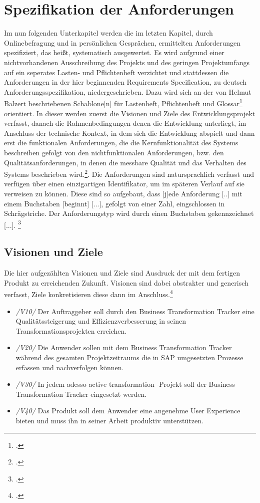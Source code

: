 \section{Spezifikation der Anforderungen}
Im nun folgenden Unterkapitel werden die im letzten Kapitel, durch Onlinebefragung und in persönlichen Gesprächen, ermittelten Anforderungen spezifiziert, das heißt, systematisch ausgewertet. Es wird aufgrund einer nichtvorhandenen Ausschreibung des Projekts und des geringen Projektumfangs auf ein seperates Lasten- und Pflichtenheft verzichtet und stattdessen die Anforderungen in der hier beginnenden \glqq{}Requirements Specification\grqq{}, zu deutsch \glqq{}Anforderungsspezifikation\grqq{}, niedergeschrieben. Dazu wird sich an der von Helmut Balzert beschriebenen \glqq{}Schablone[n] für Lastenheft, Pflichtenheft und Glossar\grqq{}\footcite[S. 492]{balzert} orientiert. In dieser werden zuerst die Visionen und Ziele des Entwicklungsprojekt verfasst, danach die Rahmenbedingungen denen die Entwicklung unterliegt, im Anschluss der technische Kontext, in dem sich die Entwicklung abspielt und dann erst die funktionalen Anforderungen, die die Kernfunktionalität des Systems beschreiben gefolgt von den nichtfunktionalen Anforderungen, bzw. den Qualitätsanforderungen, in denen die messbare Qualität und das Verhalten des Systems beschrieben wird.\footcite[Vgl.][S. 492 ff.]{balzert}. Die Anforderungen sind natursprachlich verfasst und verfügen über einen einzigartigen Identifikator, um im späteren Verlauf auf sie verweisen zu können. Diese sind so aufgebaut, dass \glqq{} [j]ede Anforderung [..] mit einem Buchstaben [beginnt] [...], gefolgt von einer Zahl, eingschlossen in Schrägstriche. Der Anforderungstyp wird durch einen Buchstaben gekennzeichnet [...].\grqq{} \footcite[S. 493]{balzert}

\subsection{Visionen und Ziele}
Die hier aufgezählten Visionen und Ziele sind Ausdruck der mit dem fertigen Produkt zu erreichenden Zukunft. Visionen sind dabei abstrakter und generisch verfasst, Ziele konkretisieren diese dann im Anschluss.\footcite[Vgl.][S. 457]{balzert}
\begin{itemize}
    \item[] \emph{/V10/} Der Auftraggeber soll durch den Business Transformation Tracker eine Qualitätssteigerung und Effizienzverbesserung in seinen Transformationsprojekten erreichen.
    \item[] \emph{/V20/} Die Anwender sollen mit dem Business Transformation Tracker während des gesamten Projektzeitraums die in SAP umgesetzten Prozesse erfassen und nachverfolgen können.
    \item[] \emph{/V30/} In jedem adesso active transformation -Projekt soll der Business Transformation Tracker eingesetzt werden.
    \item[] \emph{/V40/} Das Produkt soll dem Anwender eine angenehme User Experience bieten und muss ihn in seiner Arbeit produktiv unterstützen.\\
\end{itemize}

